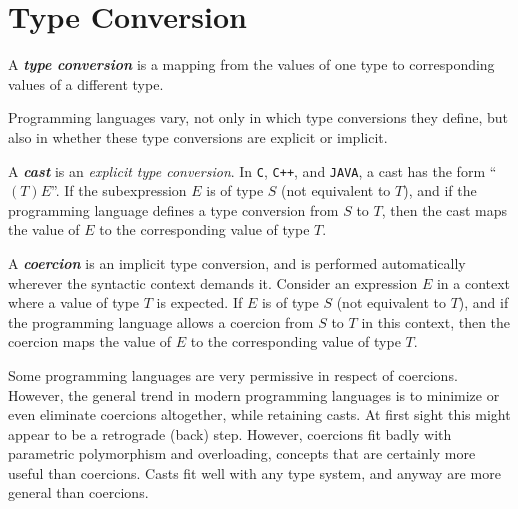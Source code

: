 \section{Type Conversion}
\label{sec:type-conversion}

A \textit{\textbf{type conversion}} is a mapping from the values of one type to corresponding values of a different type.

Programming languages vary, not only in which type conversions they define, but also in whether these type conversions are explicit or implicit.

A \textit{\textbf{cast}} is an \textit{explicit type conversion}. In \texttt{C}, \texttt{C++}, and \texttt{JAVA}, a cast has the form ``$(T)E$''. If the subexpression $E$ is of type $S$ (not equivalent to $T$), and if the programming language defines a type conversion from $S$ to $T$, then the cast maps the value of $E$ to the corresponding value of type $T$.

A \textit{\textbf{coercion}} is an implicit type conversion, and is performed automatically wherever the syntactic context demands it. Consider an expression $E$ in a context where a value of type $T$ is expected. If $E$ is of type $S$ (not equivalent to $T$), and if the programming language allows a coercion from $S$ to $T$ in this context, then the coercion maps the value of $E$ to the corresponding value of type $T$.

Some programming languages are very permissive in respect of coercions. However, the general trend in modern programming languages is to minimize or even eliminate coercions altogether, while retaining casts. At first sight this might appear to be a retrograde (back) step. However, coercions fit badly with parametric polymorphism and overloading, concepts that are certainly more useful than coercions. Casts fit well with any type system, and anyway are more general than coercions.
